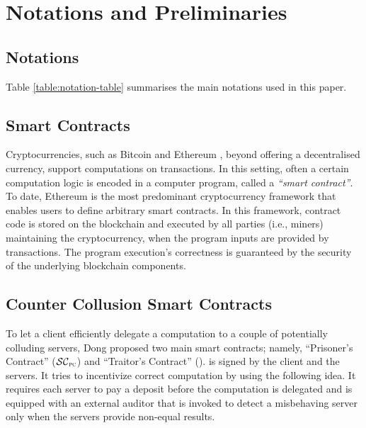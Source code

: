 

\vs
\vs
\section{Notations and Preliminaries}

\vs
\subsection{Notations}

Table \ref{table:notation-table} summarises the main notations used in this paper. 

\vs
\vs
\vs


\vs
\vs




\vs 
\subsection{Smart Contracts}

Cryptocurrencies, such as Bitcoin \cite{bitcoin} and Ethereum \cite{ethereum}, beyond offering a decentralised currency,  support computations on transactions. In this setting, often a certain computation logic is encoded in a computer program, called a \emph{``smart contract''}. To date, Ethereum is the most predominant cryptocurrency framework that enables users to define arbitrary smart contracts. In this framework,  contract code is stored on the blockchain and executed by all parties (i.e., miners) maintaining the cryptocurrency, when the program inputs are provided by transactions. The program execution's correctness is guaranteed by the security of the underlying blockchain components. %

\vs
\subsection{Counter Collusion Smart Contracts}\label{Counter-Collusion-Smart-Contracts}

To let a client efficiently delegate a computation to a  couple of potentially colluding servers, Dong   \et \cite{dong2017betrayal} proposed two main smart contracts; namely, ``Prisoner's Contract'' ($\SCpc$) and ``Traitor's Contract'' (\SCtc).  
%
\SCpc is signed by the client and the servers. It tries to incentivize correct computation by using the following idea. It requires each server to pay a deposit before the computation is delegated and is equipped with an external auditor that is invoked to detect a misbehaving server only when the servers provide non-equal results. 



